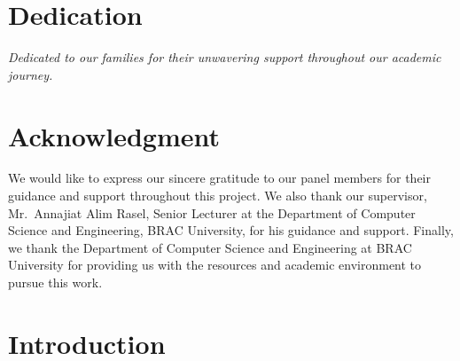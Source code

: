 \documentclass[12pt, a4paper]{report}
\begin{document}
\newpage
\thispagestyle{empty}

\chapter*{Dedication}
{}

\vspace{3cm}
\begin{center}
\textit{Dedicated to our families for their unwavering support throughout our academic journey.}
\end{center}

\newpage
\thispagestyle{empty}

\chapter*{Acknowledgment}
{}

We would like to express our sincere gratitude to our panel members for their guidance and support throughout this project. We also thank our supervisor, Mr.\ Annajiat Alim Rasel, Senior Lecturer at the Department of Computer Science and Engineering, BRAC University, for his guidance and support. Finally, we thank the Department of Computer Science and Engineering at BRAC University for providing us with the resources and academic environment to pursue this work.

\newpage
\singlespacing
\setcounter{page}{1}
\tableofcontents
\newpage
\listoffigures
\newpage
\listoftables
\newpage
{}
\setcounter{page}{1}

\chapter{Introduction}
\label{sec:intro}
\end{document}
